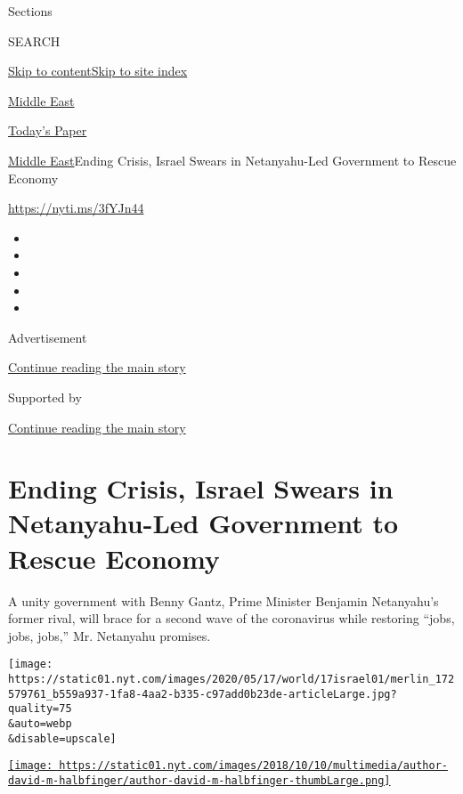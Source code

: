 Sections

SEARCH

\protect\hyperlink{site-content}{Skip to
content}\protect\hyperlink{site-index}{Skip to site index}

\href{https://www.nytimes.com/section/world/middleeast}{Middle East}

\href{https://myaccount.nytimes.com/auth/login?response_type=cookie\&client_id=vi}{}

\href{https://www.nytimes.com/section/todayspaper}{Today's Paper}

\href{/section/world/middleeast}{Middle East}\textbar{}Ending Crisis,
Israel Swears in Netanyahu-Led Government to Rescue Economy

\url{https://nyti.ms/3fYJn44}

\begin{itemize}
\item
\item
\item
\item
\item
\end{itemize}

Advertisement

\protect\hyperlink{after-top}{Continue reading the main story}

Supported by

\protect\hyperlink{after-sponsor}{Continue reading the main story}

\hypertarget{ending-crisis-israel-swears-in-netanyahu-led-government-to-rescue-economy}{%
\section{Ending Crisis, Israel Swears in Netanyahu-Led Government to
Rescue
Economy}\label{ending-crisis-israel-swears-in-netanyahu-led-government-to-rescue-economy}}

A unity government with Benny Gantz, Prime Minister Benjamin Netanyahu's
former rival, will brace for a second wave of the coronavirus while
restoring ``jobs, jobs, jobs,'' Mr. Netanyahu promises.

\texttt{[image: https://static01.nyt.com/images/2020/05/17/world/17israel01/merlin\_172579761\_b559a937-1fa8-4aa2-b335-c97add0b23de-articleLarge.jpg?quality=75\\\&auto=webp\\\&disable=upscale]}

\href{https://www.nytimes.com/by/david-m-halbfinger}{\texttt{[image: https://static01.nyt.com/images/2018/10/10/multimedia/author-david-m-halbfinger/author-david-m-halbfinger-thumbLarge.png]}}

